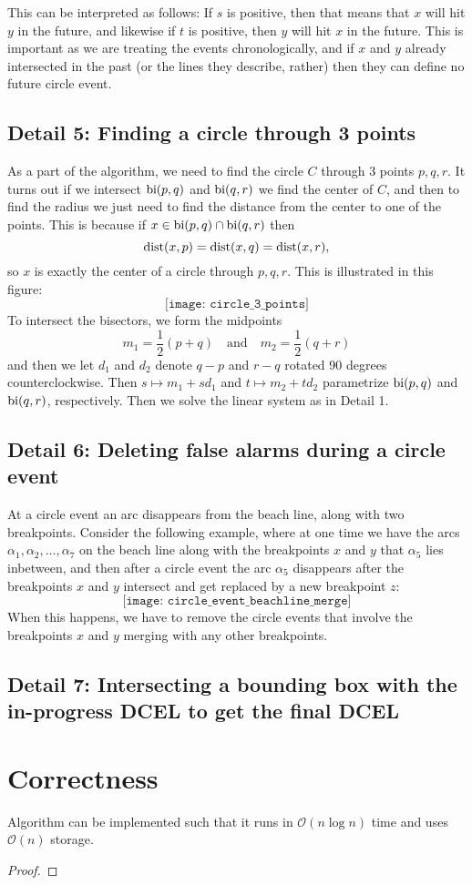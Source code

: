 This can be interpreted as follows: If $s$ is positive, then that means that $x$ will hit $y$ in the future, and likewise if $t$ is positive, then $y$ will hit $x$ in the future. This is important as we are treating the events chronologically, and if $x$ and $y$ already intersected in the past (or the lines they describe, rather) then they can define no future circle event.

\subsection*{Detail 5: Finding a circle through 3 points}
As a part of the algorithm, we need to find the circle $C$ through 3 points $p, q, r$. It turns out if we intersect $\operatorname{bi}(p, q)$ and $\operatorname{bi}(q, r)$ we find the center of $C$, and then to find the radius we just need to find the distance from the center to one of the points. This is because if $x \in \operatorname{bi}(p, q) \cap \operatorname{bi}(q, r)$ then
\[
    \operatorname{dist}(x, p) = \operatorname{dist}(x, q) = \operatorname{dist}(x, r),
\]
so $x$ is exactly the center of a circle through $p, q, r$. This is illustrated in this figure:
\[
    \texttt{[image: circle\_3\_points]}
\]
To intersect the bisectors, we form the midpoints
\[
    m_1 = \frac{1}{2}(p + q) \quad \text{and} \quad m_2 = \frac{1}{2}(q + r)
\]
and then we let $d_1$ and $d_2$ denote $q - p$ and $r - q$ rotated 90 degrees counterclockwise. Then $s \mapsto m_1 + s d_1$ and $t \mapsto m_2 + t d_2$ parametrize $\operatorname{bi}(p, q)$ and $\operatorname{bi}(q, r)$, respectively. Then we solve the linear system as in Detail 1.

\newpage
\subsection*{Detail 6: Deleting false alarms during a circle event}
At a circle event an arc disappears from the beach line, along with two breakpoints. Consider the following example, where at one time we have the arcs $\alpha_1, \alpha_2, \ldots, \alpha_7$ on the beach line along with the breakpoints $x$ and $y$ that $\alpha_5$ lies inbetween, and then after a circle event the arc $\alpha_5$ disappears after the breakpoints $x$ and $y$ intersect and get replaced by a new breakpoint $z$:
\[
    \texttt{[image: circle\_event\_beachline\_merge]}
\]
When this happens, we have to remove the circle events that involve the breakpoints $x$ and $y$ merging with any other breakpoints.

\subsection*{Detail 7: Intersecting a bounding box with the in-progress DCEL to get the final DCEL}

\section{Correctness}
\begin{lem}
Algorithm \label{alg:fortune} can be implemented such that it runs in $\mathcal{O}(n \log n)$ time and uses $\mathcal{O}(n)$ storage.
\end{lem}
\begin{proof}
\end{proof}